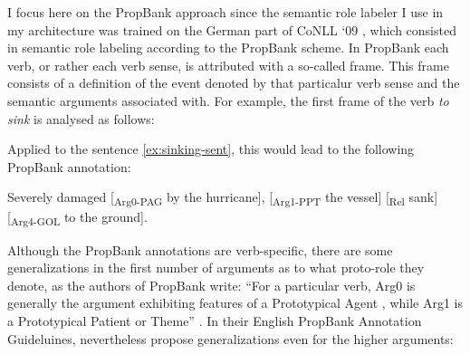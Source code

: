I focus here on the PropBank approach since the semantic role labeler I use in my
architecture was trained on the German part of CoNLL `09 \citep{hajivc2009conll}, which
consisted in semantic role labeling according to the PropBank scheme. In PropBank each
verb, or rather each verb sense, is attributed with a so-called frame. This frame
consists of a definition of the event denoted by that particalur verb sense and the
semantic arguments associated with. For example, the first frame of the verb \emph{to
sink}
is analysed as follows:

\noindent{}

Applied to the sentence  \ref{ex:sinking-sent}, this would lead to the following PropBank annotation:

\begin{examples}
  \item Severely damaged [\textsubscript{Arg0-PAG} by the hurricane], [\textsubscript{Arg1-PPT} the vessel] [\textsubscript{Rel} sank] [\textsubscript{Arg4-GOL} to the ground].
\end{examples}


Although the PropBank annotations are verb-specific, there are some generalizations in the first
number of arguments as to what proto-role they denote, as the authors of PropBank write: ``For
a particular verb, Arg0 is generally the argument exhibiting features of a Prototypical Agent
\textelp{}, while Arg1 is a Prototypical Patient or Theme'' \citep[p.~75]{palmer2005proposition}.
In their English PropBank Annotation Guideluines, \cite{bonial2012english} nevertheless propose
generalizations even for the higher arguments:

